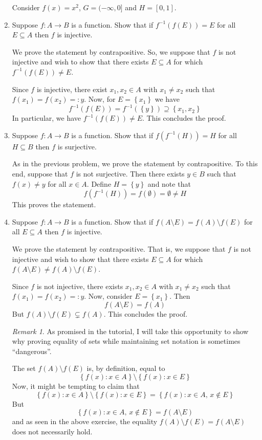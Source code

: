 \documentclass[12pt, reqno]{article}
\numberwithin{equation}{section}
\theoremstyle{definition}
\theoremstyle{remark}
\newtheorem{rem}{Remark}
\newcommand{\set}[1]{\left\{#1\right\}}
\begin{document}
\begin{enumerate}[leftmargin=*]
	      Consider $f(x) = x^2$, $G = (-\infty, 0]$ and $H = [0,1]$.

	\item Suppose $f:A\to B$ is a function. Show that if $f^{-1}(f(E)) = E$ for all $E\subseteq A$ then $f$ is injective.

	      We prove the statement by contrapositive. So, we suppose that $f$ is not injective and wish to show that there exists $E\subseteq A$ for which $f^{-1}(f(E)) \neq E$.

	      Since $f$ is injective, there exist $x_1, x_2 \in A$ with $x_1\neq x_2$ such that $f(x_1) = f(x_2) =: y$. Now, for $E = \set{x_1}$ we have
	      \[
		      f^{-1}(f(E)) = f^{-1}(\set{y}) \supseteq \set{x_1, x_2}
	      \]
	      In particular, we have $f^{-1}(f(E)) \neq E$. This concludes the proof.

	\item Suppose $f:A\to B$ is a function. Show that if $f\left(f^{-1}(H)\right) = H$ for all $H\subseteq B$ then $f$ is surjective.

	      As in the previous problem, we prove the statement by contrapositive. To this end, suppose that $f$ is not surjective. Then there exists $y\in B$ such that $f(x)\neq y$ for all $x\in A$. Define $H = \set{y}$ and note that
	      \[
		      f\left(f^{-1}(H)\right) = f(\emptyset) = \emptyset \neq H
	      \]
	      This proves the statement.

	\item Suppose $f:A\to B$ is a function. Show that if $f(A\setminus E) = f(A)\setminus f(E)$ for all $E\subseteq A$ then $f$ is injective.

	      We prove the statement by contrapositive. That is, we suppose that $f$ is not injective and wish to show that there exists $E\subseteq A$ for which $f(A\setminus E) \neq f(A)\setminus f(E)$.

	      Since $f$ is not injective, there exists $x_1, x_2\in A$ with $x_1\neq x_2$ such that $f(x_1) = f(x_2) =:y$. Now, consider $E = \set{x_1}$. Then
	      \[
		      f(A\setminus E) =  f(A)
	      \]
	      But $f(A) \setminus f(E) \subsetneq f(A)$. This concludes the proof.

	      \begin{rem}
		      As promised in the tutorial, I will take this opportunity to show why proving equality of sets while maintaining set notation is sometimes ``dangerous''.

		      The set $f(A)\setminus f(E)$ is, by definition, equal to
		      \[
			      \set{f(x) :x\in A}\setminus \set{f(x) : x\in E}
		      \]
		      Now, it might be tempting to claim that
		      \[
			      \set{f(x) :x\in A}\setminus \set{f(x) : x\in E} = \set{f(x) :x\in A,\, x\not\in E}
		      \]
		      But
		      \[
			      \set{f(x) :x\in A,\, x\not\in E} = f(A\setminus E)
		      \]
		      and as seen in the above exercise, the equality $f(A)\setminus f(E) = f(A\setminus E)$ does not necessarily hold.
	      \end{rem}


\end{enumerate}
\end{document}

